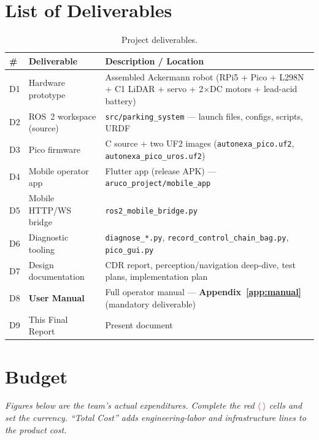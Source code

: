 \documentclass[12pt,a4paper]{report}
\newcommand{\fillin}{\textcolor{red}{$\langle\ \rangle$}}
\begin{document}
\chapter{List of Deliverables}
\label{ch:deliverables}

\begin{table}[H]
\centering
\caption{Project deliverables.}
\label{tab:deliverables}
\begin{tabularx}{\textwidth}{|p{0.7cm}|p{4.6cm}|X|}
\hline
\textbf{\#} & \textbf{Deliverable} & \textbf{Description / Location} \\
\hline
D1 & Hardware prototype & Assembled Ackermann robot (RPi5 + Pico + L298N + C1 LiDAR + servo + 2$\times$DC motors + lead-acid battery) \\
\hline
D2 & ROS~2 workspace (source) & \texttt{src/parking\_system} --- launch files, configs, scripts, URDF \\
\hline
D3 & Pico firmware & C source + two UF2 images (\texttt{autonexa\_pico.uf2}, \texttt{autonexa\_pico\_uros.uf2}) \\
\hline
D4 & Mobile operator app & Flutter app (release APK) --- \texttt{aruco\_project/mobile\_app} \\
\hline
D5 & Mobile HTTP/WS bridge & \texttt{ros2\_mobile\_bridge.py} \\
\hline
D6 & Diagnostic tooling & \texttt{diagnose\_*.py}, \texttt{record\_control\_chain\_bag.py}, \texttt{pico\_gui.py} \\
\hline
D7 & Design documentation & CDR report, perception/navigation deep-dive, test plans, implementation plan \\
\hline
D8 & \textbf{User Manual} & Full operator manual --- \textbf{Appendix~\ref{app:manual}} (mandatory deliverable) \\
\hline
D9 & This Final Report & Present document \\
\hline
\end{tabularx}
\end{table}

\chapter{Budget}
\label{ch:budget}

\noindent\textit{Figures below are the team's actual expenditures. Complete the
red \fillin{} cells and set the currency. ``Total Cost'' adds engineering-labor
and infrastructure lines to the product cost.}
\end{document}
